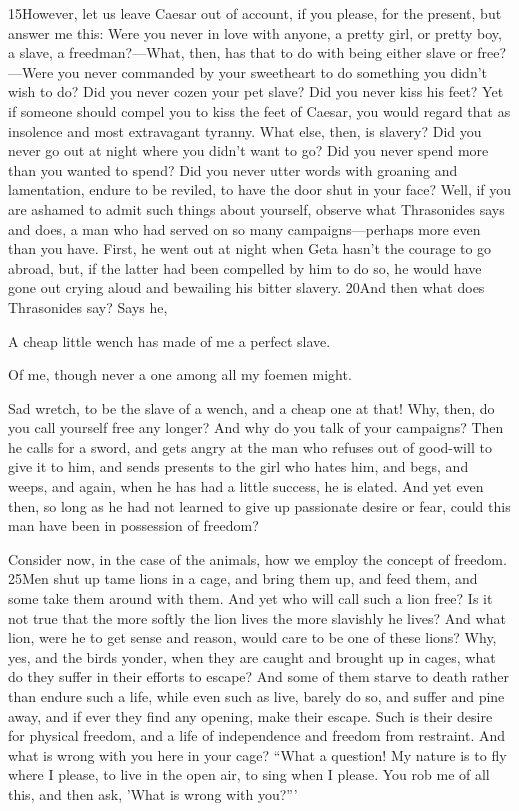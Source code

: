 15However, let us leave Caesar out of account, if you please, for the present, but answer me this: Were you never in love with anyone, a pretty girl, or pretty boy, a slave, a freedman?—What, then, has that to do with being either slave or free?—Were you never commanded by your sweetheart to do something you didn't wish to do? Did you never cozen your pet slave? Did you never kiss his feet? Yet if someone should compel you to kiss the feet of Caesar, you would regard that as insolence and most extravagant tyranny. What else, then, is slavery? Did you never go out at night where you didn't want to go? Did you never spend more than you wanted to spend? Did you never utter words with groaning and lamentation, endure to be reviled, to have the door shut in your face? Well, if you are ashamed to admit such things about yourself, observe what Thrasonides says and does, a man who had served on so many campaigns—perhaps more even than you have. First, he went out at night when Geta hasn't the courage to go abroad, but, if the latter had been compelled by him to do so, he would have gone out crying aloud and bewailing his bitter slavery. 20And then what does Thrasonides say? Says he,

A cheap little wench has made of me a perfect slave.

Of me, though never a one among all my foemen might.

Sad wretch, to be the slave of a wench, and a cheap one at that! Why, then, do you call yourself free any longer? And why do you talk of your campaigns? Then he calls for a sword, and gets angry
at the man who refuses out of good-will to give it to him, and sends presents to the girl who hates him, and begs, and weeps, and again, when he has had a little success, he is elated. And yet even then, so long as he had not learned to give up passionate desire or fear, could this man have been in possession of freedom?

Consider now, in the case of the animals, how we employ the concept of freedom. 25Men shut up tame lions in a cage, and bring them up, and feed them, and some take them around with them. And yet who will call such a lion free? Is it not true that the more softly the lion lives the more slavishly he lives? And what lion, were he to get sense and reason, would care to be one of these lions? Why, yes, and the birds yonder, when they are caught and brought up in cages, what do they suffer in their efforts to escape? And some of them starve to death rather than endure such a life, while even such as live, barely do so, and suffer and pine away, and if ever they find any opening, make their escape. Such is their desire for physical freedom, and a life of independence and freedom from restraint. And what is wrong with you here in your cage? ``What a question! My nature is to fly where I please, to live in the open air, to sing when I please. You rob me of all this, and then ask, 'What is wrong with you?'''

